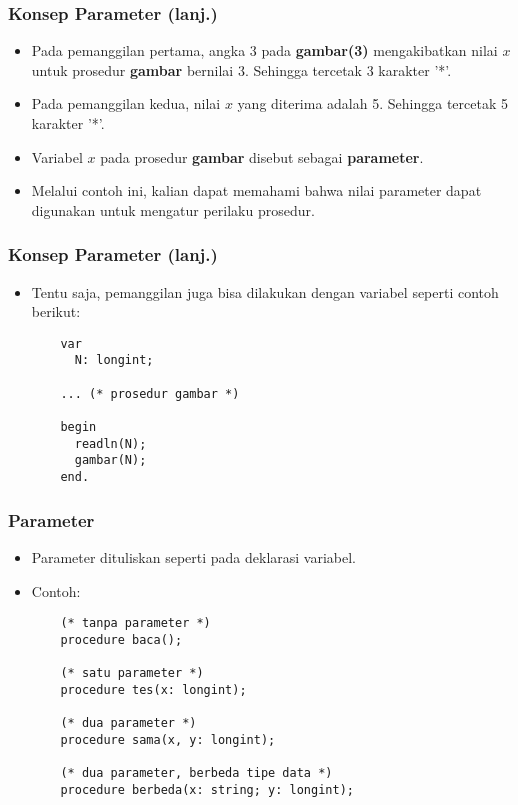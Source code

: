 \documentclass{beamer}
\begin{document}
\begin{frame}[fragile]
\frametitle{Konsep Parameter (lanj.)}
\begin{itemize}
  \item Pada pemanggilan pertama, angka 3 pada \textbf{gambar(3)} mengakibatkan nilai $x$ untuk prosedur \textbf{gambar} bernilai 3. Sehingga tercetak 3 karakter '*'.
  \item Pada pemanggilan kedua, nilai $x$ yang diterima adalah 5. Sehingga tercetak 5 karakter '*'.
  \item Variabel $x$ pada prosedur \textbf{gambar} disebut sebagai \alert{\textbf{parameter}}.
  \item Melalui contoh ini, kalian dapat memahami bahwa nilai parameter dapat digunakan untuk mengatur perilaku prosedur.
\end{itemize}
\end{frame}

\begin{frame}[fragile]
\frametitle{Konsep Parameter (lanj.)}
\begin{itemize}
  \item Tentu saja, pemanggilan juga bisa dilakukan dengan variabel seperti contoh berikut:
  \begin{lstlisting}
    var
      N: longint;

    ... (* prosedur gambar *)

    begin
      readln(N);
      gambar(N);
    end.
  \end{lstlisting}
\end{itemize}
\end{frame}

\begin{frame}[fragile]
\frametitle{Parameter}
\begin{itemize}
  \item Parameter dituliskan seperti pada deklarasi variabel.
  \item Contoh:
  \begin{lstlisting}
    (* tanpa parameter *)
    procedure baca();

    (* satu parameter *)
    procedure tes(x: longint);

    (* dua parameter *)
    procedure sama(x, y: longint);

    (* dua parameter, berbeda tipe data *)
    procedure berbeda(x: string; y: longint);
  \end{lstlisting}
\end{itemize}
\end{frame}
\end{document}
